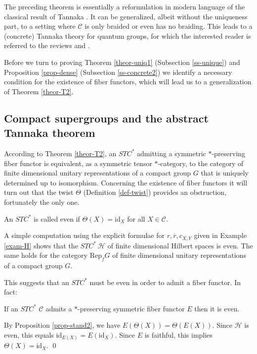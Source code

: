 \documentclass[11pt]{article}
\theoremstyle{definition}
\theoremstyle{definition}
\theoremstyle{remark}
\def\2#1{{\mathcal #1}}
\def\ol#1{{\overline #1}}
\newcommand{\Rep}{\mathrm{Rep}}
\def\id{\mathrm{id}}
\begin{document}
\brem The preceding theorem is essentially a reformulation in modern language of the classical
result of Tannaka \cite{tannaka}. It can be generalized, albeit without the uniqueness part, to a
setting where $\2C$ is only braided or even has no braiding. This leads to a (concrete) Tannaka
theory for quantum groups, for which the interested reader is referred to the reviews \cite{JS1} and
\cite{MRT}. 
\erem

Before we turn to proving Theorem \ref{theor-uniq1} (Subsection \ref{ss-unique}) and Proposition
\ref{prop-dense} (Subsection \ref{ss-concrete2}) we identify a necessary condition for the existence
of fiber functors, which will lead us to a generalization of Theorem \ref{theor-T2}.




\subsection{Compact supergroups and the abstract Tannaka theorem} 
According to Theorem \ref{theor-T2}, an $STC^*$ admitting a symmetric $*$-preserving fiber functor
is equivalent, as a symmetric tensor $*$-category, to the category of finite dimensional unitary
representations of a compact group $G$ that is uniquely determined up to isomorphism. Concerning the
existence of fiber functors it will turn out that the twist $\Theta$ (Definition \ref{def-twist})
provides an obstruction, fortunately the only one.

\bdefin {}
An $STC^*$ is called even if $\Theta(X)=\id_X$ for all $X\in\2C$.
\edefin

\bexam A simple computation using the explicit formulae for $r,\ol{r},c_{X,Y}$ given in Example
\ref{exam-H} shows that the $STC^*\ \2H$ of finite dimensional Hilbert spaces is even. The same
holds for the category $\Rep_fG$ of finite dimensional unitary representations of a compact group
$G$.
\eexam

This suggests that an $STC^*$ must be even in order to admit a fiber functor. In fact:

\bprop If an $STC^*$ $\2C$ admits a $*$-preserving symmetric fiber functor $E$ then it is even.
\eprop

\prf By Proposition \ref{prop-stand2}, we have $E(\Theta(X))=\Theta(E(X))$. Since $\2H$ is even,
this equals $\id_{E(X)}=E(\id_X)$. Since $E$ is faithful, this implies $\Theta(X)=\id_X$.  
\qed
\end{document}
